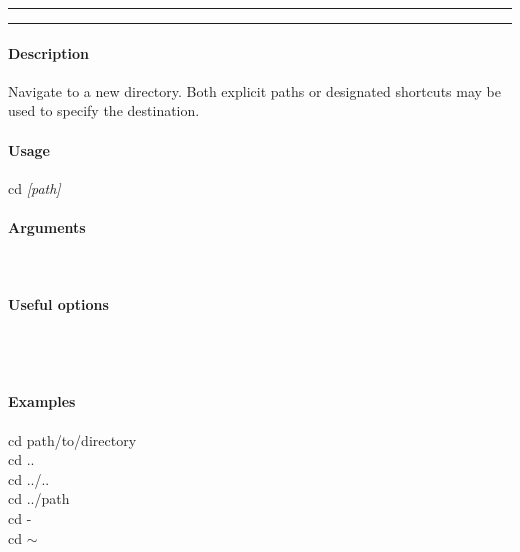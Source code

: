 \hrule
\vspace{1mm}
\hrule
\vspace{4mm}

\paragraph{Description}
\indentpar \raggedright \textrm{Navigate to a new directory. Both explicit paths or designated shortcuts may be used to specify the destination.}\\

\paragraph{Usage}
\indentpar cd \textit{[path]}

\paragraph{Arguments}
\indentpar {}\\

\paragraph{Useful options}
\indentpar {}\\
\indentpar {}\\
\indentpar {}


\paragraph{Examples}

\indentpar cd path/to/directory\\
\indentpar cd ..\\
\indentpar cd ../..\\
\indentpar cd ../path\\
\indentpar cd -\\
\indentpar cd $\sim$\\

\vspace{20mm}